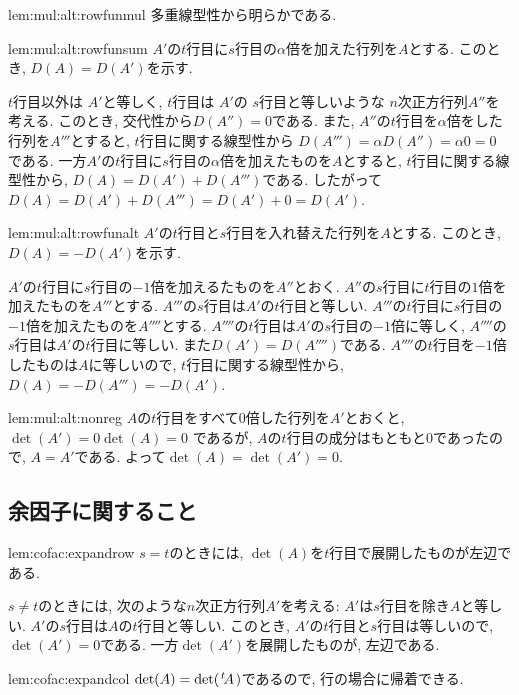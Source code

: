 \begin{proofof*}{lem:mul:alt:rowfun}{mul}
  多重線型性から明らかである.
\end{proofof*}
\begin{proofof*}{lem:mul:alt:rowfun}{sum}
  $A'$の$t$行目に$s$行目の$\alpha$倍を加えた行列を$A$とする.
  このとき, 
  $D(A)=D(A')$を示す.
  
  $t$行目以外は
  $A'$と等しく,
  $t$行目は
  $A'$の
  $s$行目と等しいような
  $n$次正方行列$A''$を考える.
  このとき, 交代性から$D(A'')=0$である.
  また, $A''$の$t$行目を$\alpha$倍をした行列を$A'''$とすると,
  $t$行目に関する線型性から
  $D(A''')=\alpha D(A'')=\alpha 0=0$
  である.
  一方$A'$の$t$行目に$s$行目の$\alpha$倍を加えたものを$A$とすると,
  $t$行目に関する線型性から,
  $D(A)=D(A')+D(A''')$である.
  したがって$D(A)=D(A')+D(A''')=D(A')+0=D(A')$.
\end{proofof*}
\begin{proofof*}{lem:mul:alt:rowfun}{alt}
  $A'$の$t$行目と$s$行目を入れ替えた行列を$A$とする.
  このとき, 
  $D(A)=-D(A')$を示す.

  $A'$の$t$行目に$s$行目の$-1$倍を加えるたものを$A''$とおく.
  $A''$の$s$行目に$t$行目の$1$倍を加えたものを$A'''$とする.
  $A'''$の$s$行目は$A'$の$t$行目と等しい.
  $A'''$の$t$行目に$s$行目の$-1$倍を加えたものを$A''''$とする.
  $A''''$の$t$行目は$A'$の$s$行目の$-1$倍に等しく,
  $A''''$の$s$行目は$A'$の$t$行目に等しい.
  また$D(A')=D(A'''')$である.
  $A''''$の$t$行目を$-1$倍したものは$A$に等しいので,
  $t$行目に関する線型性から,
  $D(A)=-D(A''')=-D(A')$.
\end{proofof*}

\begin{proofof}{lem:mul:alt:nonreg}
  $A$の$t$行目をすべて$0$倍した行列を$A'$とおくと,
  $\det(A')=0\det(A)=0$
  であるが,
  $A$の$t$行目の成分はもともと$0$であったので, $A=A'$である.
  よって$\det(A)=\det(A')=0$.
\end{proofof}


\subsection{余因子に関すること}
\begin{proofof*}{lem:cofac:expand}{row}
  $s=t$のときには, $\det(A)$を$t$行目で展開したものが左辺である.

  $s\neq t$のときには,
  次のような$n$次正方行列$A'$を考える:
  $A'$は$s$行目を除き$A$と等しい.
  $A'$の$s$行目は$A$の$t$行目と等しい.
  このとき, $A'$の$t$行目と$s$行目は等しいので,
  $\det(A')=0$である.
  一方$\det(A')$を展開したものが,
  左辺である.
\end{proofof*}
\begin{proofof*}{lem:cofac:expand}{col}
  $\det(A)=\det({\left.^{t}\!A\right.})$であるので,
  行の場合に帰着できる.
\end{proofof*}


